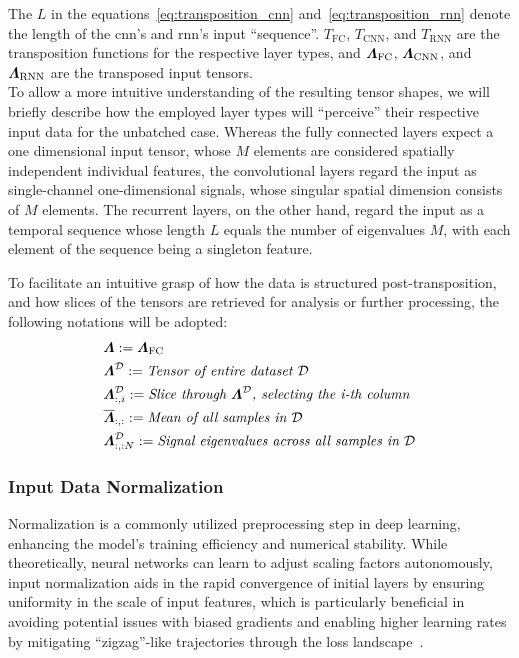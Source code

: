 The \( L \) in the equations~\ref{eq:transposition_cnn} and~\ref{eq:transposition_rnn} denote the length of the \gls{cnn}'s and
\gls{rnn}'s input ``sequence''.
\( T_{\mathrm{FC}} \), \( T_{\mathrm{CNN}} \), and \( T_{\mathrm{RNN}} \) are the transposition functions for the respective layer types, and
\( \boldsymbol{\varLambda}_{\mathrm{FC}} \), \( \boldsymbol{\varLambda}_{\mathrm{CNN}} \), and \( \boldsymbol{\varLambda}_{\mathrm{RNN}} \) are the transposed input tensors.\\
To allow a more intuitive understanding of the resulting tensor shapes, we will briefly describe how the employed layer
types will ``perceive'' their respective input data for the unbatched case.
Whereas the fully connected layers expect a one dimensional input tensor, whose \( M \) elements are considered
spatially independent individual features, the convolutional layers regard the input as single-channel one-dimensional
signals, whose singular spatial dimension consists of \( M \) elements.
The recurrent layers, on the other hand, regard the input as a temporal sequence whose length \( L \) equals the number
of eigenvalues \( M \), with each element of the sequence being a singleton feature.

To facilitate an intuitive grasp of how the data is structured post-transposition, and how slices of the tensors are
retrieved for analysis or further processing, the following notations will be adopted:
\begin{align*}
    &\boldsymbol{\varLambda} := \boldsymbol{\varLambda}_{\mathrm{FC}} \\
    &\boldsymbol{\varLambda}^{\mathcal{D}} := \textit{Tensor of entire dataset } \mathcal{D} \\
    &\boldsymbol{\varLambda}^{\mathcal{D}}_{:,i} := \textit{Slice through } \boldsymbol{\varLambda}^{\mathcal{D}} \textit{, selecting the i-th column} \\
    &\overline{\boldsymbol{\varLambda}}_{:, :} := \textit{Mean of all samples in } \mathcal{D} \\
    &\boldsymbol{\varLambda}^{\mathcal{D}}_{:,:N}:= \textit{Signal eigenvalues across all samples in } \mathcal{D}
\end{align*}


\subsubsection{Input Data Normalization}
\label{subsec:input_data_normalization}

Normalization is a commonly utilized preprocessing step in deep learning, enhancing the model's training efficiency and numerical
stability. While theoretically, neural networks can learn to adjust scaling factors autonomously,
input normalization aids in the rapid convergence of initial layers by ensuring uniformity in the scale of input features,
which is particularly beneficial in avoiding potential issues with biased gradients and enabling higher learning rates by
mitigating ``zigzag''-like trajectories through the loss landscape~\cite{yangMedium2020}.

